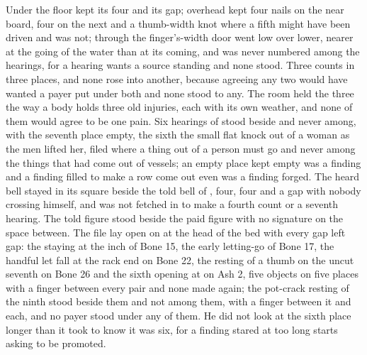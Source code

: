 Under the floor  kept its four and its gap; overhead  kept four nails on the near board, four on the next and a thumb-width knot where a fifth might have been driven and was not; through the finger's-width door  went low over lower, nearer at the going of the water than at its coming, and was never numbered among the hearings, for a hearing wants a source standing and none stood. Three counts in three places, and none rose into another, because agreeing any two would have wanted a payer put under both and none stood to any. The room held the three the way a body holds three old injuries, each with its own weather, and none of them would agree to be one pain. Six hearings of  stood beside and never among, with the seventh place empty, the sixth the small flat knock out of a woman as the men lifted her, filed where a thing out of a person must go and never among the things that had come out of vessels; an empty place kept empty was a finding and a finding filled to make a row come out even was a finding forged. The heard bell stayed in its square beside the told bell of , four, four and a gap with nobody crossing himself, and was not fetched in to make a fourth count or a seventh hearing. The told figure stood beside the paid figure with no signature on the space between. The file lay open on  at the head of the bed with every gap left gap: the staying at the inch of Bone 15, the early letting-go of Bone 17, the handful let fall at the rack end on Bone 22, the resting of a thumb on the uncut seventh on Bone 26 and the sixth opening at  on Ash 2, five objects on five places with a finger between every pair and none made again; the pot-crack resting of the ninth stood beside them and not among them, with a finger between it and each, and no payer stood under any of them. He did not look at the sixth place longer than it took to know it was six, for a finding stared at too long starts asking to be promoted.

